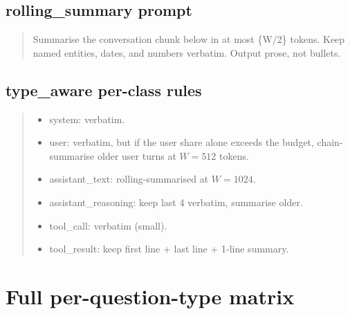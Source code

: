 \documentclass{article}
\begin{document}
\subsection{\textsf{rolling\_summary} prompt}

\begin{quote}\small\ttfamily
Summarise the conversation chunk below in at most \{W/2\} tokens. Keep
named entities, dates, and numbers verbatim. Output prose, not bullets.
\end{quote}

\subsection{\textsf{type\_aware} per-class rules}

\begin{quote}\small
\begin{itemize}
  \item \textsf{system}: verbatim.
  \item \textsf{user}: verbatim, but if the user share alone exceeds the
        budget, chain-summarise older user turns at $W{=}512$ tokens.
  \item \textsf{assistant\_text}: rolling-summarised at $W{=}1024$.
  \item \textsf{assistant\_reasoning}: keep last 4 verbatim, summarise older.
  \item \textsf{tool\_call}: verbatim (small).
  \item \textsf{tool\_result}: keep first line + last line + 1-line summary.
\end{itemize}
\end{quote}

\section{Full per-question-type matrix}\label{app:pertype}
\end{document}
